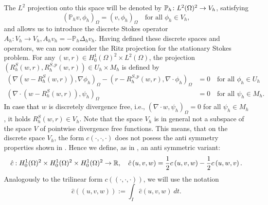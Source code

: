 \documentclass{m2an}
\newcommand\blue[1]{\textcolor{black}{#1}}
\newcommand{\throwout}[1]{}
\newcommand{\R}{\mathbb{R}}
\newcommand{\Oprod}[1]{\left( #1 \right)_{\Omega}}
\newcommand{\chatO}[1]{\hat c\left( #1 \right)}
\newcommand{\chatIO}[1]{\hat c \left(\!\left( #1 \right)\!\right)}
\newcommand{\cO}[1]{c\left( #1 \right)}
\newcommand{\cIO}[1]{c \left(\!\left( #1 \right)\!\right)}
\newcommand{\Hozs}{H^1_0(\Omega)^2}
\newcommand{\Ph}{\mathbb P_h}
\begin{document}
The $L^2$ projection onto this space will be denoted by $\mathbb P_h\colon  \blue{L^2(\Omega)^2}
\to V_h$, satisfying
\begin{equation*}
  \Oprod{\Ph v , \phi_h} = \Oprod{v,\phi_h} \quad \text{for all }\phi_h \in V_h,
\end{equation*}
and allows us to introduce the discrete Stokes operator $A_h \colon  V_h \to V_h, A_h v_h = - \Ph \Delta_h v_h$.
Having defined these discrete spaces and operators,
we can now consider the Ritz projection for the stationary 
Stokes problem.
For any $(w,r) \in H^1_0(\Omega)^2 \times L^2(\Omega)$, 
the projection $\left(R^S_h(w,r),R^{S,p}_h(w,r)\right) \in U_h \times M_h$ is defined by
\begin{equation}\label{eq:stokes_ritzprojection}
  \begin{aligned}
    \Oprod{\nabla \left(w - R^S_h(w,r)\right),\nabla \phi_h} 
    - \Oprod{r - R^{S,p}_h(w,r),\nabla \cdot \phi_h} &= 0
    \quad \text{for all } \phi_h \in U_h\\
    \Oprod{\nabla \cdot \left(w - R^S_h(w,r)\right),\psi_h} &= 0
    \quad \text{for all } \psi_h \in M_h.
  \end{aligned}
\end{equation}
\blue{In case that} $w$ is discretely divergence free, i.e., $\Oprod{\nabla \cdot w,\psi_h}=0$ 
for all $\psi_h \in M_h$, it holds $R_h^S(w,r) \in V_h$.
Note that the space $V_h$ is in general
not a subspace of the space $V$ of pointwise divergence free 
functions.
This means, that on the discrete space $V_h$, the form $\cO{\cdot,\cdot,\cdot}$ does not posess
the anti symmetry properties shown in .
Hence we define, as in \cite{heywood_finite_1986,Chrysafinos2010}, an anti symmetric variant:
\begin{equation}\label{eq:anti_symmetrized_c}
  \hat c: \blue{\Hozs \times \Hozs \times \Hozs} \to \R,
  \quad \chatO{u,v,w} = \frac{1}{2} \cO{u,v,w} - \frac{1}{2} \cO{u,w,v}.
\end{equation}
Analogously to the trilinear form $\cIO{\cdot,\cdot,\cdot}$, we will use the notation
\begin{equation*}
    \chatIO{u,v,w} := \int_I \chatO{u,v,w} \ dt.
\end{equation*}
\end{document}
